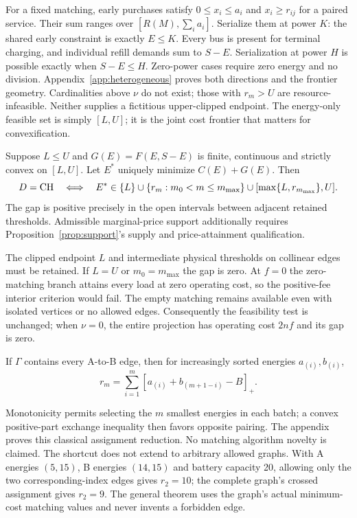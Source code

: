 For a fixed matching, early purchases satisfy $0\le x_i\le a_i$ and
$x_i\ge r_{ij}$ for a paired service. Their sum ranges over
$[R(M),\sum_i a_i]$. Serialize them at power $K$: the shared early
constraint is exactly $E\le K$. Every bus is present for terminal
charging, and individual refill demands sum to $S-E$. Serialization at
power $H$ is possible exactly when $S-E\le H$. Zero-power cases require
zero energy and no division. Appendix~\ref{app:heterogeneous} proves
both directions and the frontier geometry. Cardinalities above $\nu$ do
not exist; those with $r_m>U$ are resource-infeasible. Neither supplies
a fictitious upper-clipped endpoint.
The energy-only feasible set is simply $[L,U]$; it is the joint cost
frontier that matters for convexification.

\begin{corollary}\label{cor:sharedsupport}
Suppose $L\le U$ and $G(E)=F(E,S-E)$ is finite, continuous and strictly
convex on $[L,U]$. Let $E^*$ uniquely minimize $C(E)+G(E)$. Then
\begin{equation}\label{eq:sharedsupport}
 D=\mathrm{CH}\quad\Longleftrightarrow\quad E^*\in
 \{L\}\cup\{r_m:m_0<m\le m_{\max}\}
 \cup[\max\{L,r_{m_{\max}}\},U].
\end{equation}
The gap is positive precisely in the open intervals between adjacent
retained thresholds. Admissible marginal-price support additionally
requires Proposition~\ref{prop:support}'s supply and price-attainment
qualification.
\end{corollary}

The clipped endpoint $L$ and intermediate physical thresholds on collinear
edges must be retained. If $L=U$ or $m_0=m_{\max}$ the gap is zero.
At $f=0$ the zero-matching branch attains every load at zero operating
cost, so the positive-fee interior criterion would fail.
The empty matching remains available even with isolated vertices or no
allowed edges. Consequently the feasibility test is unchanged; when
$\nu=0$, the entire projection has operating cost $2nf$ and its gap is zero.

\begin{corollary}\label{cor:sortedmatching}
If $\Gamma$ contains every A-to-B edge, then for increasingly sorted
energies $a_{(i)},b_{(i)}$,
\[
 r_m=\sum_{i=1}^m[a_{(i)}+b_{(m+1-i)}-B]_+.
\]
\end{corollary}
Monotonicity permits selecting the $m$ smallest energies in each batch;
a convex positive-part exchange inequality then favors opposite pairing.
The appendix proves this classical assignment reduction. No matching
algorithm novelty is claimed.
The shortcut does not extend to arbitrary allowed graphs. With A energies
$(5,15)$, B energies $(14,15)$ and battery capacity 20, allowing only the
two corresponding-index edges gives $r_2=10$; the complete graph's crossed
assignment gives $r_2=9$. The general theorem uses the graph's actual
minimum-cost matching values and never invents a forbidden edge.

